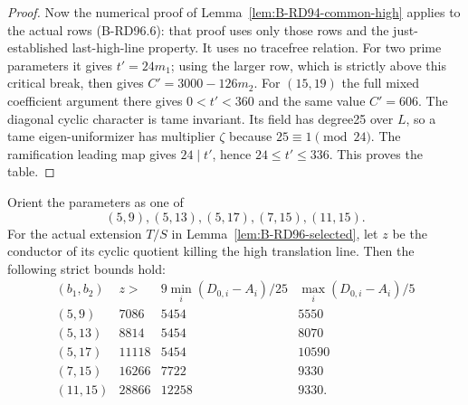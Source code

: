 \begin{proof}
Now the numerical proof of Lemma~\ref{lem:B-RD94-common-high}
applies to the actual rows (B-RD96.6): that proof uses only those
rows and the just-established last-high-line property. It uses
no tracefree relation. For two prime parameters it gives
$t'=24m_1$; using the larger row, which is strictly above this
critical break, then gives $C'=3000-126m_2$.
For $(15,19)$ the full mixed coefficient argument there gives
$0<t'<360$ and the same value $C'=606$. The diagonal cyclic
character is tame invariant. Its field has degree25 over $L$,
so a tame eigen-uniformizer has multiplier $\zeta$ because
$25\equiv1\pmod {24}$. The ramification leading map gives
$24\mid t'$, hence $24\le t'\le336$. This proves the table.
\end{proof}

\begin{proposition}
\label{prop:B-RD96-conductor}
Orient the parameters as one of
\[
                    (5,9),(5,13),(5,17),(7,15),(11,15).
                                                        \tag{B-RD96.11}
\]
For the actual extension $T/S$ in Lemma~\ref{lem:B-RD96-selected},
let $z$ be the conductor of its cyclic quotient killing the high
translation line. Then the following strict bounds hold:
\[
\begin{array}{c|r|r|r}
 (b_1,b_2)&z>&9\min_i(D_{0,i}-A_i)/25&
                              \max_i(D_{0,i}-A_i)/5\\\hline
 (5,9)&7086&5454&5550\\
 (5,13)&8814&5454&8070\\
 (5,17)&11118&5454&10590\\
 (7,15)&16266&7722&9330\\
 (11,15)&28866&12258&9330.
\end{array}                                             \tag{B-RD96.12}
\]
\end{proposition}
